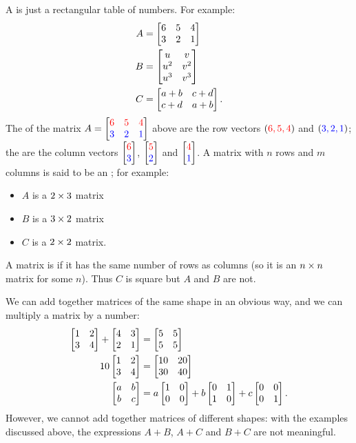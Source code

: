 \documentclass[a4paper]{book}
\theoremstyle{definition}
\begin{document}
A  is just a rectangular table of numbers.  For example:
\begin{align*}
 A &= \begin{bmatrix} 6 & 5 & 4 \\ 3 & 2 & 1 \end{bmatrix} \\
 B &= \begin{bmatrix} u & v \\ u^2 & v^2 \\ u^3 & v^3 \end{bmatrix} \\
 C &= \begin{bmatrix} a+b & c+d \\ c+d & a+b \end{bmatrix}.
\end{align*}
The  of the matrix 
$A = \begin{bmatrix} {\color{red}6} & {\color{red}5} & {\color{red}4} \\
          {\color{blue}3} & {\color{blue}2} & {\color{blue}1} 
\end{bmatrix}$
above are the row vectors $({\color{red}6,5,4})$ and $({\color{blue}3,2,1})$; the
 are the column vectors $\begin{bmatrix}{\color{red}6}\\{\color{blue}3}\end{bmatrix}$,
$\begin{bmatrix}{\color{red}5}\\{\color{blue}2}\end{bmatrix}$ and $\begin{bmatrix}{\color{red}4}\\{\color{blue}1}\end{bmatrix}$.  A matrix
with $n$ rows and $m$ columns is said to be an ;
for example:
\begin{itemize}
 \item $A$ is a $2\times 3$ matrix
 \item $B$ is a $3\times 2$ matrix
 \item $C$ is a $2\times 2$ matrix.
\end{itemize}
A matrix is  if it has the same number of rows as columns
(so it is an $n\times n$ matrix for some $n$).  Thus $C$ is square but
$A$ and $B$ are not.

We can add together matrices of the same shape in an obvious way, and
we can multiply a matrix by a number:
\begin{align*}
 \begin{bmatrix} 1 & 2 \\ 3 & 4 \end{bmatrix} + 
 \begin{bmatrix} 4 & 3 \\ 2 & 1 \end{bmatrix} &= 
 \begin{bmatrix} 5 & 5 \\ 5 & 5 \end{bmatrix} \\
 10 \begin{bmatrix} 1 & 2 \\ 3 & 4 \end{bmatrix}  &= 
 \begin{bmatrix} 10 & 20 \\ 30 & 40 \end{bmatrix} \\
 \begin{bmatrix} a & b \\ b & c \end{bmatrix} &= 
 a \begin{bmatrix} 1 & 0 \\ 0 & 0 \end{bmatrix} +
 b \begin{bmatrix} 0 & 1 \\ 1 & 0 \end{bmatrix} +
 c \begin{bmatrix} 0 & 0 \\ 0 & 1 \end{bmatrix}.
\end{align*}
However, we cannot add together matrices of different shapes: with the
examples discussed above, the expressions $A+B$, $A+C$ and $B+C$ are
not meaningful.
\end{document}
